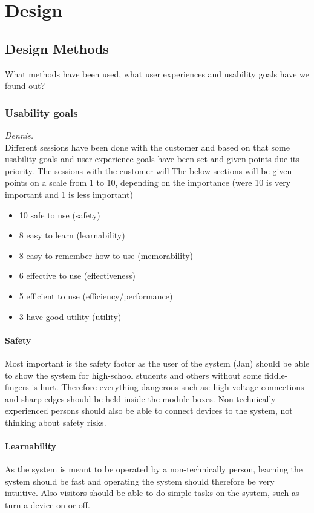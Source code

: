 \chapter{Design}
\section{Design Methods}
What methods have been used, what user experiences and usability goals have we found out?
\subsection{Usability goals}\textit{Dennis.}\\
Different sessions have been done with the customer and based on that some usability goals and user experience goals have been set and given points due its priority. The sessions with the customer will 
The below sections will be given points on a scale from 1 to 10, depending on
the importance (were 10 is very important and 1 is less important)
\begin{itemize}
	\item 10 safe to use (safety)
	\item 8 easy to learn (learnability) 
	\item 8 easy to remember how to use (memorability)
	\item 6 effective to use (effectiveness) 
	\item 5 efficient to use (efficiency/performance)
	\item 3 have good utility (utility)	
\end{itemize}
\subsubsection{Safety}
Most important is the safety factor as the user of the system (Jan) should be able to show the system for high-school students and others without some fiddle-fingers is hurt. Therefore everything dangerous such as: high voltage connections and sharp edges should be held inside the module boxes.
Non-technically experienced persons should also be able to connect devices to the system, not thinking about safety risks. 
\subsubsection{Learnability}
As the system is meant to be operated by a non-technically person, learning the system should be fast and operating the system should therefore be very intuitive. 
Also visitors should be able to do simple tasks on the system, such as turn a device on or off.
